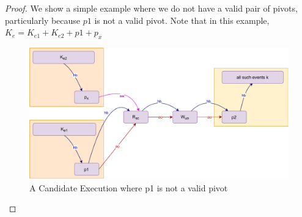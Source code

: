\begin{proof}
        
        
        
        
        
        
        We show a simple example where we do not have a valid pair of pivots, particularly because $p1$ is not a valid pivot. Note that in this example, $K_e = K_{e1} + K_{e2} + p1 + p_x$
        \begin{figure}[H]
            \centering
            \includegraphics[scale=0.7]{Q1(e).pdf}
            \caption{A Candidate Execution where p1 is not a valid pivot}
            \label{fig:my_label}
        \end{figure}
        

\end{proof}
